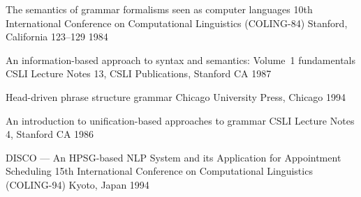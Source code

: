 \documentclass[12pt]{report}
\begin{document}
\begin{list}{}
{The semantics of grammar formalisms seen as computer languages}
{10th International Conference on Computational Linguistics
(COLING-84)}
{Stanford, California}
{123--129}
{1984}

 {An information-based approach to syntax and semantics: 
Volume~1 fundamentals} 
 {CSLI Lecture Notes 13, CSLI Publications, Stanford CA}
 {1987}

    {Head-driven phrase structure grammar}
    {Chicago University Press, Chicago}
    {1994}


{An introduction to unification-based approaches to grammar}
{CSLI Lecture Notes 4, Stanford CA}
{1986}

{{DISCO} --- An {HPSG}-based {NLP} System and its Application for 
Appointment Scheduling}
{15th International Conference on Computational
Linguistics (COLING-94)}
{Kyoto, Japan}
{1994}

\end{list}
\end{document}
